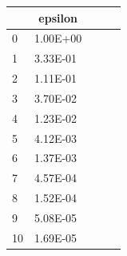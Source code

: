\begin{table}[H]
\begin{tabular}{lllll}
\rowcolor[HTML]{9AB4FF} 
\multicolumn{1}{c}{\cellcolor[HTML]{9AB4FF} row} & \multicolumn{1}{c}{\cellcolor[HTML]{9AB4FF} epsilon}\\ \hline
0 & 1.00E+00 \\ \hline1 & 3.33E-01 \\ \hline2 & 1.11E-01 \\ \hline3 & 3.70E-02 \\ \hline4 & 1.23E-02 \\ \hline5 & 4.12E-03 \\ \hline6 & 1.37E-03 \\ \hline7 & 4.57E-04 \\ \hline8 & 1.52E-04 \\ \hline9 & 5.08E-05 \\ \hline10 & 1.69E-05 \\ \hline\end{tabular}
\end{table}

